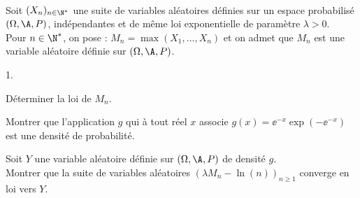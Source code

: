 \documentclass[11pt]{article}%
\begin{document}

\begin{exerciceSP}~\\
  Soit $(X_n)_{n\in\N^*}$ une suite de variables aléatoires définies
  sur un espace probabilisé $(\Omega,\A,P)$, indépendantes et de même
  loi exponentielle de paramètre $\lambda>0$.\\
  Pour $n\in\N^*$, on pose : $M_n=\max(X_1,\hdots,X_n)$ et on admet
  que $M_n$ est une variable aléatoire définie sur $(\Omega,\A,P)$.
  \begin{noliste}{1.}
    \setlength{\itemsep}{2mm}
  \item Déterminer la loi de $M_n$.
  \item Montrer que l'application $g$ qui à tout réel $x$ associe
    $g(x)=\ee^{-x}\exp\left(-\ee^{-x}\right)$ est une densité de
    probabilité.
  \item Soit $Y$ une variable aléatoire définie sur $(\Omega,\A,P)$ de
    densité $g$.\\
    Montrer que la suite de variables aléatoires $(\lambda M_n -
    \ln(n))_{n\geq 1}$ converge en loi vers $Y$.
  \end{noliste}
\end{exerciceSP}




\end{document}
